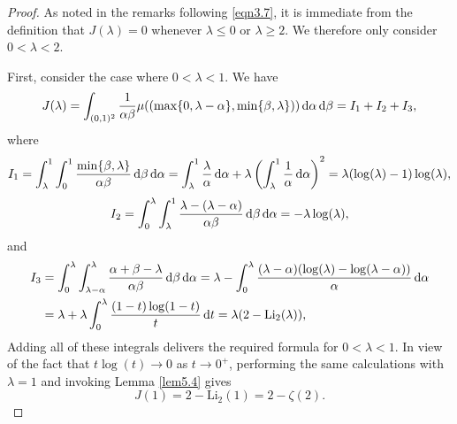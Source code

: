 \documentclass[12pt,reqno]{amsart}
\theoremstyle{definition}
\theoremstyle{remark}
\numberwithin{equation}{section}
\def\d{{\,{\rm d}}}
\def \Li {\mathrm{Li}}
\newcommand\1{\mathds{1}}
\begin{document}
\begin{proof}
    As noted in the remarks following \eqref{eqn3.7}, it is immediate from the definition that $J(\lambda) = 0$ whenever $\lambda\leqslant 0$ or $\lambda\geqslant 2$. We therefore only consider $0<\lambda<2$.

    First, consider the case where $0<\lambda< 1$. We have
    \begin{equation*}
        J(\lambda) = \int_{(0,1)^2}\frac{1}{\alpha\beta}\mu((\max\{0,\lambda -\alpha\},\min\{\beta,\lambda\}))\d \alpha\d\beta = I_1 + I_2 + I_3,
    \end{equation*}
    where
        \begin{align*}
        I_1 = \int_\lambda^1\int_0^1\frac{\min\{\beta,\lambda\}}{\alpha\beta}\d\beta\d\alpha = \int_\lambda^1\frac{\lambda}{\alpha}\d\alpha +\lambda\left(\int_{\lambda}^1\frac{1}{\alpha}\d\alpha\right)^2= \lambda(\log(\lambda)-1)\log(\lambda),
    \end{align*}
        \begin{align*}
        I_2 =  \int_0^\lambda\int_\lambda^1\frac{\lambda - (\lambda-\alpha)}{\alpha\beta}\d \beta\d \alpha = -\lambda\log(\lambda),
    \end{align*}
    and
    \begin{align*}
        I_3 &= \int_0^\lambda\int_{\lambda-\alpha}^\lambda\frac{\alpha+\beta-\lambda}{\alpha\beta}\d\beta\d\alpha =\lambda - \int_0^\lambda\frac{(\lambda-\alpha)(\log(\lambda) - \log(\lambda-\alpha))}{\alpha}\d\alpha \\
        &=\lambda + \lambda\int_0^\lambda\frac{(1-t)\log(1-t)}{t}\d t = \lambda(2-\Li_2(\lambda)),
    \end{align*}
    Adding all of these integrals delivers the required formula for $0<\lambda<1$. In view of the fact that $t\log(t)\to 0$ as $t\to 0^+$, performing the same calculations with $\lambda = 1$ and invoking Lemma \ref{lem5.4} gives
    \begin{equation*}
        J(1) =2-\Li_2(1) = 2-\zeta(2).
    \end{equation*}


\end{proof}
\end{document}
